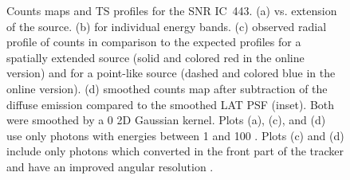 \begin{figure}
    \fi
    \caption{
    Counts maps and TS profiles for the SNR IC~443. (a) \ts
    vs. extension of the source. (b) \tsext for individual energy
    bands. (c) observed radial profile of counts in comparison to the
    expected profiles for a spatially extended source (solid and colored
    red in the online version) and for a point-like source (dashed and colored
    blue in the online version).  (d) smoothed counts map after subtraction
    of the diffuse emission compared to the smoothed
    LAT PSF (inset). Both were smoothed by a 0 2D Gaussian kernel.
    Plots (a),
    (c), and (d) use only 
    photons with energies between
    1 \gev and 100 \gev.  Plots (c) and (d) include
    only photons which converted in the front part of the tracker and
    have an improved angular resolution \citep{atwood_2009a_large-telescope}.
    }
\end{figure}

